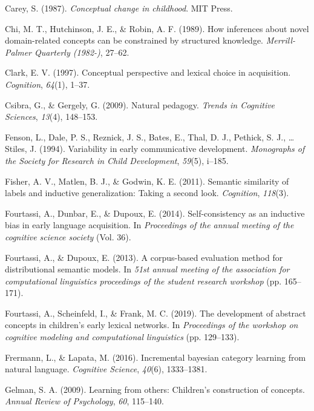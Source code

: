 \documentclass[english,,man,floatsintext]{apa6}
\begin{document}
\leavevmode\hypertarget{ref-carey1987}{}%
Carey, S. (1987). \emph{Conceptual change in childhood}. MIT Press.

\leavevmode\hypertarget{ref-chi1989}{}%
Chi, M. T., Hutchinson, J. E., \& Robin, A. F. (1989). How inferences about novel domain-related concepts can be constrained by structured knowledge. \emph{Merrill-Palmer Quarterly (1982-)}, 27--62.

\leavevmode\hypertarget{ref-clark1997}{}%
Clark, E. V. (1997). Conceptual perspective and lexical choice in acquisition. \emph{Cognition}, \emph{64}(1), 1--37.

\leavevmode\hypertarget{ref-csibra2009}{}%
Csibra, G., \& Gergely, G. (2009). Natural pedagogy. \emph{Trends in Cognitive Sciences}, \emph{13}(4), 148--153.

\leavevmode\hypertarget{ref-fenson94}{}%
Fenson, L., Dale, P. S., Reznick, J. S., Bates, E., Thal, D. J., Pethick, S. J., \ldots{} Stiles, J. (1994). Variability in early communicative development. \emph{Monographs of the Society for Research in Child Development}, \emph{59}(5), i--185.

\leavevmode\hypertarget{ref-fisher2011}{}%
Fisher, A. V., Matlen, B. J., \& Godwin, K. E. (2011). Semantic similarity of labels and inductive generalization: Taking a second look. \emph{Cognition}, \emph{118}(3).

\leavevmode\hypertarget{ref-fourtassi2014}{}%
Fourtassi, A., Dunbar, E., \& Dupoux, E. (2014). Self-consistency as an inductive bias in early language acquisition. In \emph{Proceedings of the annual meeting of the cognitive science society} (Vol. 36).

\leavevmode\hypertarget{ref-fourtassi2013}{}%
Fourtassi, A., \& Dupoux, E. (2013). A corpus-based evaluation method for distributional semantic models. In \emph{51st annual meeting of the association for computational linguistics proceedings of the student research workshop} (pp. 165--171).

\leavevmode\hypertarget{ref-fourtassi2019}{}%
Fourtassi, A., Scheinfeld, I., \& Frank, M. C. (2019). The development of abstract concepts in children's early lexical networks. In \emph{Proceedings of the workshop on cognitive modeling and computational linguistics} (pp. 129--133).

\leavevmode\hypertarget{ref-frermann2016}{}%
Frermann, L., \& Lapata, M. (2016). Incremental bayesian category learning from natural language. \emph{Cognitive Science}, \emph{40}(6), 1333--1381.

\leavevmode\hypertarget{ref-gelman2009}{}%
Gelman, S. A. (2009). Learning from others: Children's construction of concepts. \emph{Annual Review of Psychology}, \emph{60}, 115--140.
\end{document}

